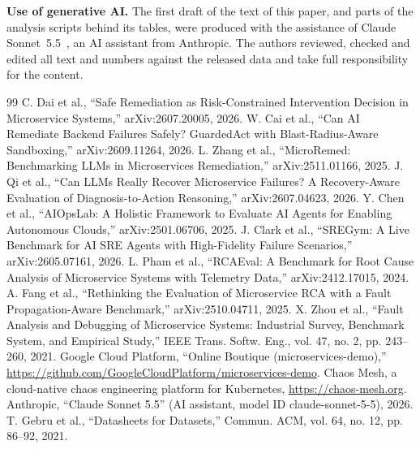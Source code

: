\documentclass[10pt,conference]{IEEEtran}
\begin{document}
\textbf{Use of generative AI.} The first draft of the text of this paper, and parts of the analysis scripts behind its tables, were produced with the assistance of Claude Sonnet~5.5~\cite{claude}, an AI assistant from Anthropic. The authors reviewed, checked and edited all text and numbers against the released data and take full responsibility for the content.

\begin{thebibliography}{99}
 C. Dai et al., ``Safe Remediation as Risk-Constrained Intervention Decision in Microservice Systems,'' arXiv:2607.20005, 2026.
 W. Cai et al., ``Can AI Remediate Backend Failures Safely? GuardedAct with Blast-Radius-Aware Sandboxing,'' arXiv:2609.11264, 2026.
 L. Zhang et al., ``MicroRemed: Benchmarking LLMs in Microservices Remediation,'' arXiv:2511.01166, 2025.
 J. Qi et al., ``Can LLMs Really Recover Microservice Failures? A Recovery-Aware Evaluation of Diagnosis-to-Action Reasoning,'' arXiv:2607.04623, 2026.
 Y. Chen et al., ``AIOpsLab: A Holistic Framework to Evaluate AI Agents for Enabling Autonomous Clouds,'' arXiv:2501.06706, 2025.
 J. Clark et al., ``SREGym: A Live Benchmark for AI SRE Agents with High-Fidelity Failure Scenarios,'' arXiv:2605.07161, 2026.
 L. Pham et al., ``RCAEval: A Benchmark for Root Cause Analysis of Microservice Systems with Telemetry Data,'' arXiv:2412.17015, 2024.
 A. Fang et al., ``Rethinking the Evaluation of Microservice RCA with a Fault Propagation-Aware Benchmark,'' arXiv:2510.04711, 2025.
 X. Zhou et al., ``Fault Analysis and Debugging of Microservice Systems: Industrial Survey, Benchmark System, and Empirical Study,'' IEEE Trans. Softw. Eng., vol. 47, no. 2, pp. 243--260, 2021.
 Google Cloud Platform, ``Online Boutique (microservices-demo),'' \url{https://github.com/GoogleCloudPlatform/microservices-demo}.
 Chaos Mesh, a cloud-native chaos engineering platform for Kubernetes, \url{https://chaos-mesh.org}.
 Anthropic, ``Claude Sonnet 5.5'' (AI assistant, model ID claude-sonnet-5-5), 2026.
 T. Gebru et al., ``Datasheets for Datasets,'' Commun. ACM, vol. 64, no. 12, pp. 86--92, 2021.
\end{thebibliography}
\end{document}
